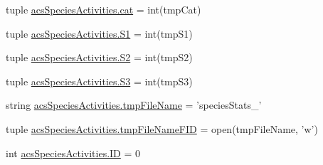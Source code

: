 \begin{DoxyCompactItemize}
tuple \hyperlink{a00131_a721a520fa04949579e29cb858dc00bf0}{acs\+Species\+Activities.\+cat} = int(tmp\+Cat)
\item 
tuple \hyperlink{a00131_a4ffac9566fa24baa2b27ccd97f9ffe1e}{acs\+Species\+Activities.\+S1} = int(tmp\+S1)
\item 
tuple \hyperlink{a00131_a3b95f66d848ccbac2740be2878b2499b}{acs\+Species\+Activities.\+S2} = int(tmp\+S2)
\item 
tuple \hyperlink{a00131_a654d2a657cf4b354b3791a8b2de3d74e}{acs\+Species\+Activities.\+S3} = int(tmp\+S3)
\item 
string \hyperlink{a00131_a23844a8104156ee329f8c957f11490f4}{acs\+Species\+Activities.\+tmp\+File\+Name} = 'species\+Stats\+\_\+'
\item 
tuple \hyperlink{a00131_addb867cf8533f2e18682c49f08f47bba}{acs\+Species\+Activities.\+tmp\+File\+Name\+F\+I\+D} = open(tmp\+File\+Name, 'w')
\item 
int \hyperlink{a00131_a8102909ea2c113190493bd581f17ba18}{acs\+Species\+Activities.\+I\+D} = 0
\end{DoxyCompactItemize}
